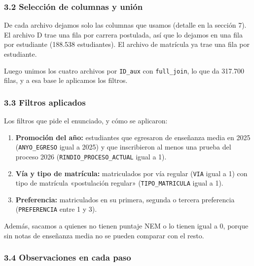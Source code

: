 \documentclass[11pt,letterpaper]{article}
\begin{document}
\subsubsection*{3.2 \; Selección de columnas y unión}

De cada archivo dejamos solo las columnas que usamos (detalle en la
sección 7). El archivo D trae una fila por carrera postulada, así que lo
dejamos en una fila por estudiante (188.538 estudiantes). El archivo de
matrícula ya trae una fila por estudiante.

Luego unimos los cuatro archivos por \texttt{ID\_aux} con
\texttt{full\_join}, lo que da 317.700 filas, y a esa base le aplicamos
los filtros.

\subsubsection*{3.3 \; Filtros aplicados}

Los filtros que pide el enunciado, y cómo se aplicaron:

\begin{enumerate}[leftmargin=1.5em, itemsep=0.3em, label=\textbf{\alph*)}]
  \item \textbf{Promoción del año:} estudiantes que egresaron de enseñanza
        media en 2025 (\texttt{ANYO\_EGRESO} igual a 2025) y que
        inscribieron al menos una prueba del proceso 2026
        (\texttt{RINDIO\_PROCESO\_ACTUAL} igual a 1).
  \item \textbf{Vía y tipo de matrícula:} matriculados por vía regular
        (\texttt{VIA} igual a 1) con tipo de matrícula «postulación
        regular» (\texttt{TIPO\_MATRICULA} igual a 1).
  \item \textbf{Preferencia:} matriculados en su primera, segunda o
        tercera preferencia (\texttt{PREFERENCIA} entre 1 y 3).
\end{enumerate}

Además, sacamos a quienes no tienen puntaje NEM o lo tienen igual a 0,
porque sin notas de enseñanza media no se pueden comparar con el resto.

\subsubsection*{3.4 \; Observaciones en cada paso}
\end{document}
